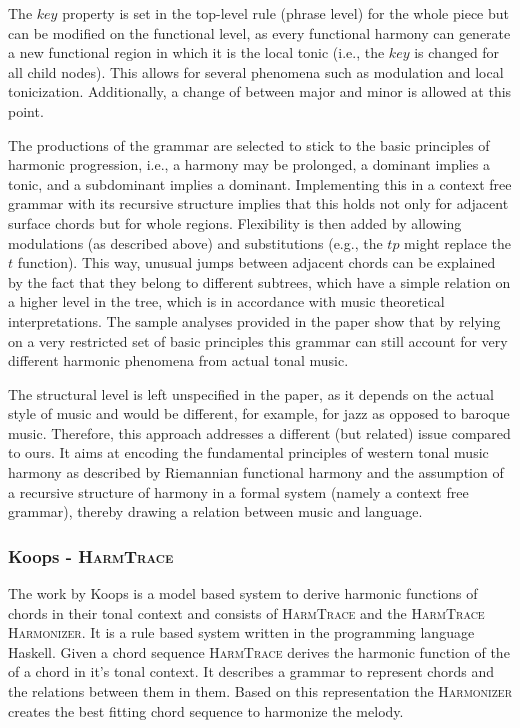 The $key$ property is set in the top-level rule (phrase level) for the whole piece but can be modified on the functional level, as every functional harmony can generate a new functional region in which it is the local tonic (i.e., the $key$ is changed for all child nodes).
This allows for several phenomena such as modulation and local tonicization.
Additionally, a change of between major and minor is allowed at this point.

The productions of the grammar are selected to stick to the basic principles of harmonic progression, i.e., a harmony may be prolonged, a dominant implies a tonic, and a subdominant implies a dominant.
Implementing this in a context free grammar with its recursive structure implies that this holds not only for adjacent surface chords but for whole regions.
Flexibility is then added by allowing modulations (as described above) and substitutions (e.g., the $tp$ might replace the $t$ function).
This way, unusual jumps between adjacent chords can be explained by the fact that they belong to different subtrees, which have a simple relation on a higher level in the tree, which is in accordance with music theoretical interpretations.
The sample analyses provided in the paper show that by relying on a very restricted set of basic principles this grammar can still account for very different harmonic phenomena from actual tonal music.

The structural level is left unspecified in the paper, as it depends on the actual style of music and would be different, for example, for jazz as opposed to baroque music.
Therefore, this approach addresses a different (but related) issue compared to ours.
It aims at encoding the fundamental principles of western tonal music harmony as described by Riemannian functional harmony and the assumption of a recursive structure of harmony in a formal system (namely a context free grammar), thereby drawing a relation between music and language.

\subsubsection{Koops - \textsc{HarmTrace}}
The work by Koops \autocite{koops2012model} is a model based system to derive harmonic functions of chords in their tonal context and consists of \textsc{HarmTrace} and the \textsc{HarmTrace Harmonizer}. It is a rule based system written in the programming language Haskell. Given a chord sequence \textsc{HarmTrace} derives the harmonic function of the of a chord in it's tonal context. It describes a grammar to represent chords and the relations between them in them. Based on this representation the \textsc{Harmonizer} creates the best fitting chord sequence to harmonize the melody.


